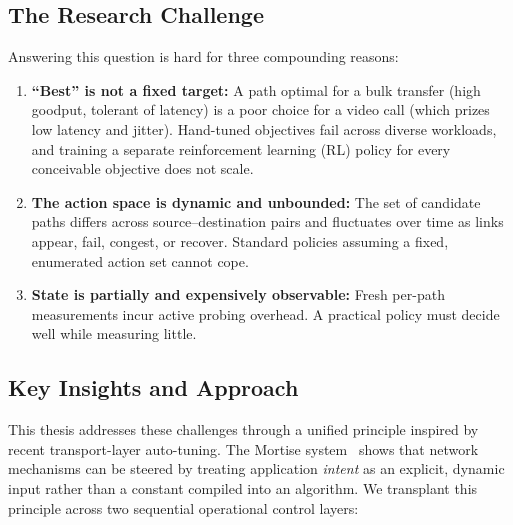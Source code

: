 \subsection{The Research Challenge}
\label{sec:intro:challenge}
Answering this question is hard for three compounding reasons:
\begin{enumerate}
    \item \textbf{``Best'' is not a fixed target:} A path optimal for a bulk transfer (high goodput, tolerant of latency) is a poor choice for a video call (which prizes low latency and jitter). Hand-tuned objectives fail across diverse workloads, and training a separate reinforcement learning (RL) policy for every conceivable objective does not scale.
    \item \textbf{The action space is dynamic and unbounded:} The set of candidate paths differs across source--destination pairs and fluctuates over time as links appear, fail, congest, or recover. Standard policies assuming a fixed, enumerated action set cannot cope.
    \item \textbf{State is partially and expensively observable:} Fresh per-path measurements incur active probing overhead. A practical policy must decide well while measuring little.
\end{enumerate}

\subsection{Key Insights and Approach}
\label{sec:intro:approach}
This thesis addresses these challenges through a unified principle inspired by recent transport-layer auto-tuning. The Mortise system~\cite{Shen2026} shows that network mechanisms can be steered by treating application \emph{intent} as an explicit, dynamic input rather than a constant compiled into an algorithm. We transplant this principle across two sequential operational control layers:

